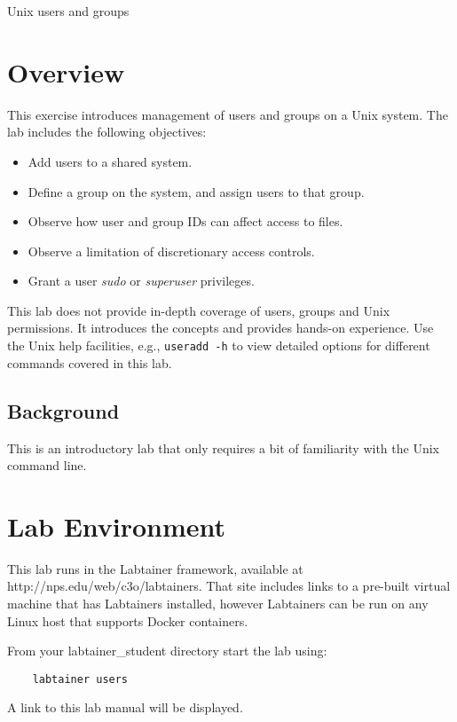 


\begin{center}
{\LARGE Unix users and groups}
\vspace{0.1in}\\
\end{center}


\section{Overview}
This exercise introduces management of users and groups on a Unix system.  
The lab includes the following objectives:
\begin{itemize}
\item Add users to a shared system.
\item Define a group on the system, and assign users to that group.
\item Observe how user and group IDs can affect access to files.
\item Observe a limitation of discretionary access controls.
\item Grant a user \textit{sudo} or \textit{superuser} privileges.
\end{itemize}

This lab does not provide in-depth coverage of users, groups and Unix permissions.  It introduces the concepts
and provides hands-on experience.  Use the Unix help facilities, e.g., {\tt useradd -h} to view detailed options
for different commands covered in this lab.

\subsection{Background}
This is an introductory lab that only requires a bit of familiarity with the Unix command line.

\section{Lab Environment}
This lab runs in the Labtainer framework,
available at http://nps.edu/web/c3o/labtainers.
That site includes links to a pre-built virtual machine
that has Labtainers installed, however Labtainers can
be run on any Linux host that supports Docker containers.

From your labtainer_student directory start the lab using:
\begin{verbatim}
    labtainer users
\end{verbatim}
A link to this lab manual will be displayed.


